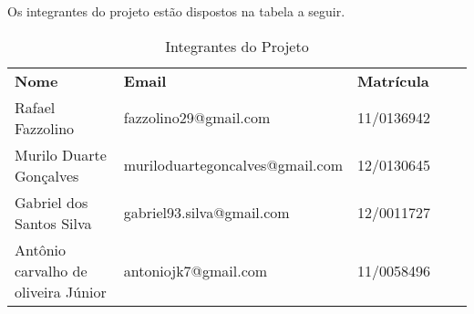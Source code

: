 
Os integrantes do projeto estão dispostos na tabela a seguir.

\begin{table}[H]
	\centering
	\label{my-label}
	\begin{tabular}{lllll}
		\cline{1-3}
		\multicolumn{1}{|l|}{\textbf{Nome}}    & \multicolumn{1}{l|}{\textbf{Email}}        & \multicolumn{1}{l|}{\textbf{Matrícula}} &  &  \\ \cline{1-3}
		\multicolumn{1}{|l|}{Rafael Fazzolino} & \multicolumn{1}{l|}{fazzolino29@gmail.com} & \multicolumn{1}{l|}{11/0136942}         &  &  \\ \cline{1-3}
		\multicolumn{1}{|l|}{Murilo Duarte Gonçalves}                 & \multicolumn{1}{l|}{muriloduartegoncalves@gmail.com}                      & \multicolumn{1}{l|}{12/0130645}                   &  &  \\ \cline{1-3}
		\multicolumn{1}{|l|}{Gabriel dos Santos Silva}    & \multicolumn{1}{l|}{gabriel93.silva@gmail.com}                      & \multicolumn{1}{l|}{12/0011727}                   &  &  \\ \cline{1-3}
		\multicolumn{1}{|l|}{Antônio carvalho de oliveira Júnior}    & \multicolumn{1}{l|}{antoniojk7@gmail.com}                      & \multicolumn{1}{l|}{11/0058496}                   &  &  \\ \cline{1-3}
	\end{tabular}
	\caption{Integrantes do Projeto}
\end{table}